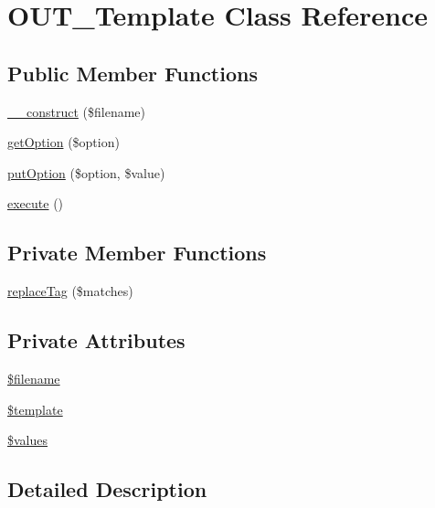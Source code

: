 \hypertarget{classOUT__Template}{
\section{OUT\_\-Template Class Reference}
\label{d0/dcf/classOUT__Template}
}
\subsection*{Public Member Functions}
\begin{DoxyCompactItemize}
\item 
\hyperlink{classOUT__Template_ad750e5ccf638adee8a6bcb8794c1eb3f}{\_\-\_\-construct} (\$filename)
\item 
\hyperlink{classOUT__Template_a2f0cd6dd6fe55fbc4926cfa10bf48abb}{getOption} (\$option)
\item 
\hyperlink{classOUT__Template_a068a09ea40b27447cbf3cd4540939a8e}{putOption} (\$option, \$value)
\item 
\hyperlink{classOUT__Template_a87d9c155f0467841a0ce3a61c6131f5e}{execute} ()
\end{DoxyCompactItemize}
\subsection*{Private Member Functions}
\begin{DoxyCompactItemize}
\item 
\hyperlink{classOUT__Template_a851f1584ccf3a08203c13b89b9b18c95}{replaceTag} (\$matches)
\end{DoxyCompactItemize}
\subsection*{Private Attributes}
\begin{DoxyCompactItemize}
\item 
\hyperlink{classOUT__Template_a296bfcd3d6b713859bd81c827d87aa3e}{\$filename}
\item 
\hyperlink{classOUT__Template_a1c04c575b35949f8146c1a5eef5c2ed7}{\$template}
\item 
\hyperlink{classOUT__Template_a60c326b6e906fce16b17436540625a66}{\$values}
\end{DoxyCompactItemize}


\subsection{Detailed Description}


